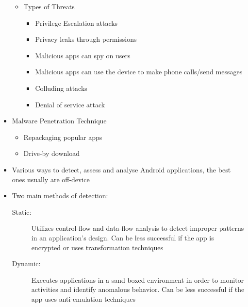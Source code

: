 \begin{itemize}
\begin{itemize}
		\item Types of Threats
		\begin{itemize}
			\item Privilege Escalation attacks
			\item Privacy leaks through permissions
			\item Malicious apps can spy on users
			\item Malicious apps can use the device to make phone calls/send messages
			\item Colluding attacks
			\item Denial of service attack
		\end{itemize}
	\end{itemize}
	\item Malware Penetration Technique
	\begin{itemize}
		\item Repackaging popular apps
		\item Drive-by download
	\end{itemize}
	\item Various ways to detect, assess and analyse Android applications, the best ones usually are off-device
	\item Two main methods of detection:
	\begin{description}
		\item[Static:] Utilizes control-flow and data-flow analysis to detect improper patterns in an application's design. Can be less successful if the app is encrypted or uses transformation techniques
		\item[Dynamic:] Executes applications in a sand-boxed environment in order to monitor activities and identify anomalous behavior. Can be less successful if the app uses anti-emulation techniques
	\end{description}
\end{itemize}